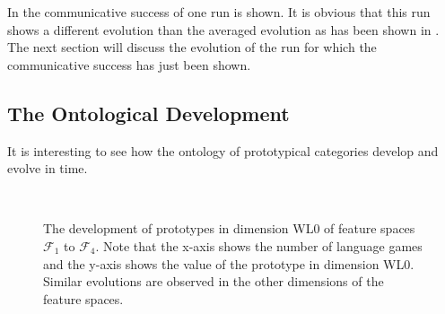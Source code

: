 In  the communicative success of one run is shown. It is obvious that this run shows a different evolution than the averaged evolution as has been shown in . The next section will discuss the evolution of the run for which the communicative success has just been shown.

\subsection{The Ontological Development}\label{s:cat:evol}

It is interesting to see how the ontology of prototypical categories develop and evolve in time.

\begin{figure}[t]
\centering
{}
\\
\caption{The development of prototypes in dimension WL0 of feature spaces ${\mathcal F}_1$ to ${\mathcal F}_4$. Note that the x-axis shows the number of language games and the y-axis shows the value of the prototype in dimension WL0. Similar evolutions are observed in the other dimensions of the feature spaces.}
\label{f:cat:evol1}
\end{figure}

